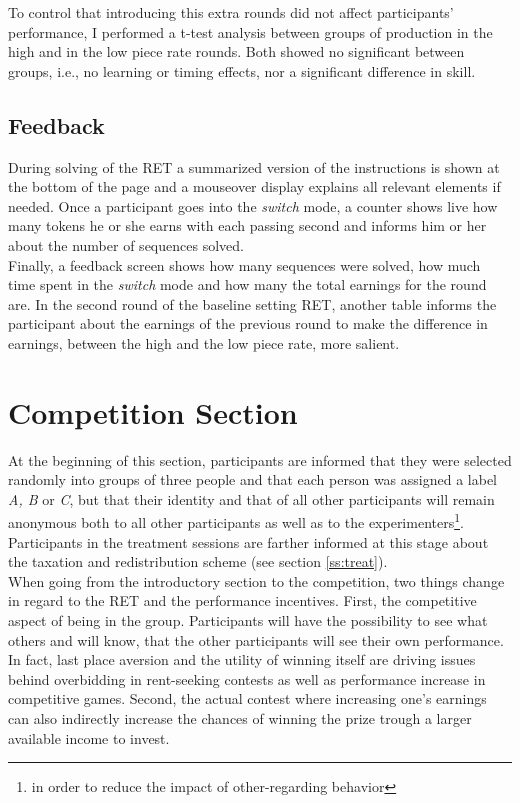     To control that introducing this extra rounds did not affect participants' performance, I performed a t-test analysis between groups of production in the high and in the low piece rate rounds. Both showed no significant between groups, i.e., no learning or timing effects, nor a significant difference in skill.
    
    \subsection{Feedback}
    
    During solving of the RET a summarized version of the instructions is shown at the bottom of the page and a mouseover display explains all relevant elements if needed. Once a participant goes into the \textit{switch} mode, a counter shows live how many tokens he or she earns with each passing second and informs him or her about the number of sequences solved.\\
    
    Finally, a feedback screen shows how many sequences were solved, how much time spent in the \textit{switch} mode and how many the total earnings for the round are. In the second round of the baseline setting RET, another table informs the participant about the earnings of the previous round to make the difference in earnings, between the high and the low piece rate, more salient.
    
    \section{Competition Section}
    \label{ss:compt}
    
    At the beginning of this section, participants are informed that they were selected randomly into groups of three people and that each person was assigned a label \textit{A, B} or \textit{C}, but that their identity and that of all other participants will remain anonymous both to all other participants as well as to the experimenters\footnote{in order to reduce the impact of other-regarding behavior}. Participants in the treatment sessions are farther informed at this stage about the taxation and redistribution scheme (see section \ref{ss:treat}).\\
    
    When going from the introductory section to the competition, two things change in regard to the RET and the performance incentives. First, the competitive aspect of being in the group. Participants will have the possibility to see what others and will know, that the other participants will see their own performance. In fact, last place aversion and the utility of winning itself are driving issues behind overbidding in rent-seeking contests \citep{sheremeta2013} as well as performance increase in competitive games. Second, the actual contest where increasing one's earnings can also indirectly increase the chances of winning the prize trough a larger available income to invest.\\
    
